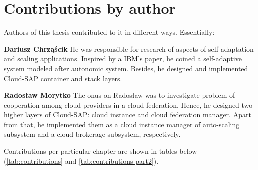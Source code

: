 \chapter{Contributions by author} 

Authors of this thesis contributed to it in different ways. Essentially: 

\begin{asparaenum}
 
 \item[\textbf{Dariusz Chrząścik}] He was responsible for research of aspects of self-adaptation and scaling applications. Inspired by a IBM's paper, he coined a self-adaptive system modeled after autonomic system. Besides, he designed and implemented Cloud-SAP container and stack layers.
 
 \item[\textbf{Radosław Morytko}] The onus on Radosław was to investigate problem of cooperation among cloud providers in a cloud federation. Hence, he designed two higher layers of Cloud-SAP: cloud instance and cloud federation manager. Apart from that, he implemented them as a cloud instance manager of auto-scaling subsystem and a cloud brokerage subsystem, respectively. 
 
\end{asparaenum}


Contributions per particular chapter are shown in tables below (\ref{tab:contributions} and \ref{tab:contributions-part2}).

